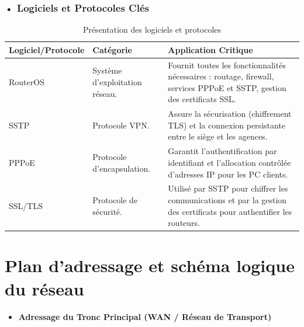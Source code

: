 \subsubsection*{• Logiciels et Protocoles Clés}
\begin{table}[H]
\centering
\caption{Présentation des logiciels et protocoles}
\label{tab:logiciels et protocoles}
\renewcommand{\arraystretch}{1.4}
\begin{tabular}{|p{4cm}|p{4cm}|p{6cm}|}
\hline
\textbf{Logiciel/Protocole} & \textbf{Catégorie} & \textbf{Application Critique} \\
\hline
\gls{RouterOS} &
Système d'exploitation réseau. &
Fournit toutes les fonctionnalités nécessaires : routage, firewall, services \gls{PPPoE} et \gls{SSTP}, gestion des certificats \gls{SSL}. \\
\hline
\gls{SSTP} &
Protocole \gls{VPN}. &
Assure la sécurisation (chiffrement \gls{TLS}) et la connexion persistante entre le siège et les agences. \\
\hline
\gls{PPPoE} &
Protocole d'encapsulation. &
Garantit l'authentification par identifiant et l'allocation contrôlée d'adresses \gls{IP} pour les \gls{PC} clients. \\
\hline
\gls{SSL}\//\gls{TLS} &
Protocole de sécurité. &
Utilisé par \gls{SSTP} pour chiffrer les communications et par la gestion des certificats pour authentifier les routeurs. \\
\hline
\end{tabular}
\end{table}

\section{Plan d’adressage et schéma logique du réseau}

\begin{itemize}
\item \textbf{Adressage du Tronc Principal (WAN / Réseau de Transport)}
\end{itemize}


